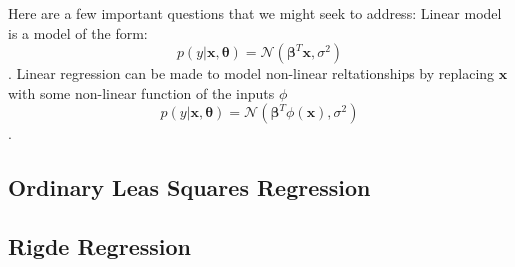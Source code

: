 Here are a few important questions that we might seek to address:
Linear model is a model of the form:
$$ p(y|\bm{x}, \bm{\theta}) = \mathcal{N}\left(
\bm{\beta}^{T}\bm{x},\sigma^{2}\right)$$.
Linear regression can be made to model non-linear reltationships by replacing
$\bm{x}$ with some non-linear function of the inputs $\phi$
$$ p(y|\bm{x}, \bm{\theta}) = \mathcal{N}\left(
\bm{\beta}^{T}\phi(\bm{x}),\sigma^{2}\right)$$.
%
\subsection{Ordinary Leas Squares Regression}

\subsection{Rigde Regression}

%
%
